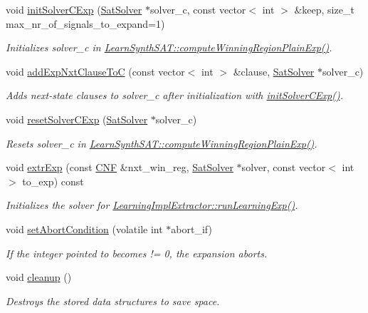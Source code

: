 \begin{DoxyCompactItemize}
void \hyperlink{classUnivExpander_a909bf44bb238afe91f4bf20416491771}{init\-Solver\-C\-Exp} (\hyperlink{classSatSolver}{Sat\-Solver} $\ast$solver\-\_\-c, const vector$<$ int $>$ \&keep, size\-\_\-t max\-\_\-nr\-\_\-of\-\_\-signals\-\_\-to\-\_\-expand=1)
\begin{DoxyCompactList}\small\item\em Initializes solver\-\_\-c in \hyperlink{classLearnSynthSAT_a8727927b4e0432acb6bcea883fd2f1f9}{Learn\-Synth\-S\-A\-T\-::compute\-Winning\-Region\-Plain\-Exp()}. \end{DoxyCompactList}\item 
void \hyperlink{classUnivExpander_a7798c75e574c747502af62a6b2e16ce4}{add\-Exp\-Nxt\-Clause\-To\-C} (const vector$<$ int $>$ \&clause, \hyperlink{classSatSolver}{Sat\-Solver} $\ast$solver\-\_\-c)
\begin{DoxyCompactList}\small\item\em Adds next-\/state clauses to solver\-\_\-c after initialization with \hyperlink{classUnivExpander_a909bf44bb238afe91f4bf20416491771}{init\-Solver\-C\-Exp()}. \end{DoxyCompactList}\item 
void \hyperlink{classUnivExpander_a27bb05f7f6a31a700d7407c45aebb6e8}{reset\-Solver\-C\-Exp} (\hyperlink{classSatSolver}{Sat\-Solver} $\ast$solver\-\_\-c)
\begin{DoxyCompactList}\small\item\em Resets solver\-\_\-c in \hyperlink{classLearnSynthSAT_a8727927b4e0432acb6bcea883fd2f1f9}{Learn\-Synth\-S\-A\-T\-::compute\-Winning\-Region\-Plain\-Exp()}. \end{DoxyCompactList}\item 
void \hyperlink{classUnivExpander_adab48e1ba7b95b7e439f7c2f5f2e809a}{extr\-Exp} (const \hyperlink{classCNF}{C\-N\-F} \&nxt\-\_\-win\-\_\-reg, \hyperlink{classSatSolver}{Sat\-Solver} $\ast$solver, const vector$<$ int $>$ to\-\_\-exp) const 
\begin{DoxyCompactList}\small\item\em Initializes the solver for \hyperlink{classLearningImplExtractor_aa61a9c39a6cb6e6e04eeb3ca876e50be}{Learning\-Impl\-Extractor\-::run\-Learning\-Exp()}. \end{DoxyCompactList}\item 
void \hyperlink{classUnivExpander_a56b6465bd5d8f5d939c253f7aca49c59}{set\-Abort\-Condition} (volatile int $\ast$abort\-\_\-if)
\begin{DoxyCompactList}\small\item\em If the integer pointed to becomes != 0, the expansion aborts. \end{DoxyCompactList}\item 
void \hyperlink{classUnivExpander_af2c2e34bd041cbeff5ad9726a5b48895}{cleanup} ()
\begin{DoxyCompactList}\small\item\em Destroys the stored data structures to save space. \end{DoxyCompactList}\end{DoxyCompactItemize}
